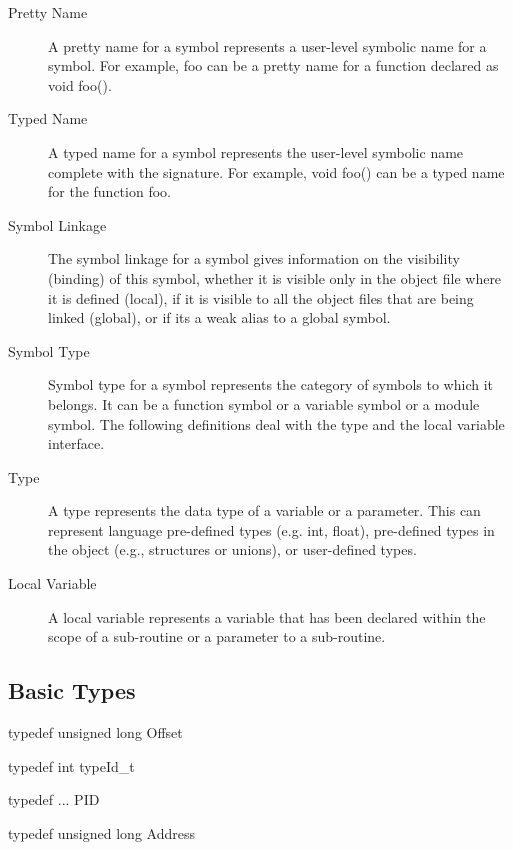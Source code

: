\begin{description}
\item[Pretty Name] A pretty name for a symbol represents a user-level symbolic name for a symbol. For example, foo can be a pretty name for a function declared as void foo().
\item[Typed Name] A typed name for a symbol represents the user-level symbolic name complete with the signature. For example, void foo() can be a typed name for the function foo.
\item[Symbol Linkage] The symbol linkage for a symbol gives information on the visibility (binding) of this symbol, whether it is visible only in the object file where it is defined (local), if it is visible to all the object files that are being linked (global), or if its a weak alias to a global symbol.
\item[Symbol Type] Symbol type for a symbol represents the category of symbols to which it belongs. It can be a function symbol or a variable symbol or a module symbol.
The following definitions deal with the type and the local variable interface.
\item[Type] A type represents the data type of a variable or a parameter. This can represent language pre-defined types (e.g. int, float), pre-defined types in the object (e.g., structures or unions), or user-defined types.
\item[Local Variable] A local variable represents a variable that has been declared within the scope of a sub-routine or a parameter to a sub-routine.
\end{description}

\subsection{Basic Types}

\begin{apient}
typedef unsigned long Offset
\end{apient}
\begin{apient}
typedef int typeId_t
\end{apient}
\begin{apient}
typedef ... PID
\end{apient}
\begin{apient}
typedef unsigned long Address
\end{apient}
